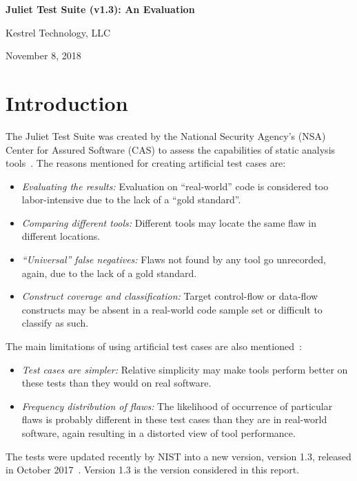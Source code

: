 \documentclass[11pt]{article}
\begin{document}
\vfill
\vfill


{\Large\bf{
Juliet Test Suite (v1.3): An Evaluation}}

\vfill

{\Large{Kestrel Technology, LLC}}

\bigskip

November 8, 2018

\vfill
\vfill
\vfill

\newpage
\tableofcontents
\newpage

\section{Introduction}

The Juliet Test Suite was created by the National Security Agency's (NSA)
Center for Assured Software (CAS) to assess the capabilities of static
analysis tools~\cite{Juliet12}. The reasons mentioned for creating artificial
test cases are:
\begin{itemize}
\item {\it Evaluating the results:} Evaluation on ``real-world'' code is 
considered too
labor-intensive due to the lack of a ``gold standard''.
\item {\it Comparing different tools:} Different tools may locate the same flaw
in different locations.
\item {\it ``Universal'' false negatives:} Flaws not found by any tool go 
unrecorded, again, due to the lack of a gold standard.
\item {\it Construct coverage and classification:} Target control-flow or 
data-flow constructs may be absent in a real-world code sample set or difficult
to classify as such.
\end{itemize}

The main limitations of using artificial test cases are also 
mentioned~\cite{Juliet12}:
\begin{itemize}
\item {\it Test cases are simpler:} Relative simplicity may make tools perform
better on these tests than they would on real software.
\item {\it Frequency distribution of flaws:} 
The likelihood of occurrence of particular flaws is probably different in these
test cases than they are in real-world software, again resulting in a distorted
view of tool performance.
\end{itemize}

The tests were updated recently by NIST into a new version, version  1.3,
released in October 2017~\cite{NIST1995}. Version 1.3 is the version considered
in this report.
\end{document}
